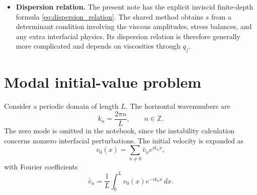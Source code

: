 \documentclass[11pt,a4paper]{article}
\begin{document}
\begin{itemize}[leftmargin=*]
    \item \textbf{Dispersion relation.}
    The present note has the explicit inviscid finite-depth formula \eqref{eq:dispersion_relation}.  The shared method obtains $s$ from a determinant condition involving the viscous amplitudes, stress balances, and any extra interfacial physics.  Its dispersion relation is therefore generally more complicated and depends on viscosities through $q_j$.
\end{itemize}

\section{Modal initial-value problem}

Consider a periodic domain of length $L$.  The horizontal wavenumbers are
\begin{equation}
    k_n = \frac{2\pi n}{L},
    \qquad n\in\mathbb{Z}.
\end{equation}
The zero mode is omitted in the notebook, since the instability calculation concerns nonzero interfacial perturbations.  The initial velocity is expanded as
\begin{equation}
    v_0(x)=\sum_{n\neq 0} \widehat{v}_n e^{i k_n x},
\end{equation}
with Fourier coefficients
\begin{equation}
    \widehat{v}_n
    =
    \frac{1}{L}\int_0^L v_0(x)e^{-i k_n x}\,dx.
    \label{eq:fourier_coefficients}
\end{equation}
\end{document}
